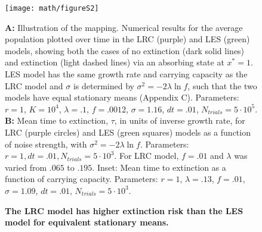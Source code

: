\begin{figure}[h]
\centerline{
	\texttt{[image: math/figureS2]}}
	\caption{\textbf{The LRC model has higher extinction risk than the LES model for equivalent stationary means.}} {\textbf{A:} Illustration of the mapping.  Numerical results for the average population plotted over time in the LRC (purple) and LES (green) models, showing both the cases of no extinction (dark solid lines) and extinction (light dashed lines) via an absorbing state at $x^* = 1$.  LES model has the same growth rate and carrying capacity as the LRC model and $\sigma$ is determined by $\sigma^2 = -2\lambda\ln f$, such that the two models have equal stationary means (Appendix C).  Parameters:  $r = 1$, $K = 10^4$, $\lambda = .1$, $f = .0012$, $\sigma = 1.16$, $dt = .01$, $N_{trials} = 5\cdot 10^5$.  \textbf{B:}  Mean time to extinction, $\tau$, in units of inverse growth rate, for LRC (purple circles) and LES (green squares) models as a function of noise strength, with $\sigma^2 = -2\lambda\ln f$.   Parameters:  $r = 1, dt = .01, N_{trials} = 5\cdot 10^3$.  For LRC model, $f = .01$ and $\lambda$ was varied from $.065$ to $.195$.  Inset:  Mean time to extinction as a function of carrying capacity.  Parameters:  $r = 1$,  $\lambda = .13$, $f = .01$, $\sigma = 1.09$, $dt = .01$, $N_{trials} = 5\cdot 10^3$.}
\end{figure}

\renewcommand\thefigure{\arabic{figure}}    


